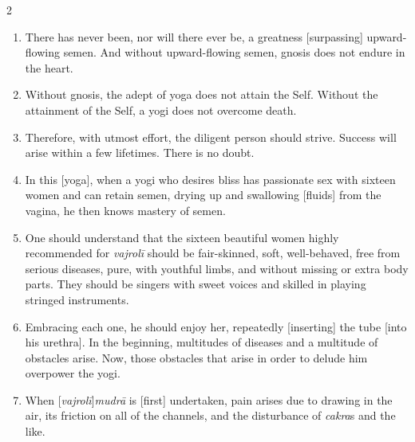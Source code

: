 \newpage

\begin{nohyp}
\begin{multicols}{2}
\begin{eng}
\begin{enumerate}[nosep]
\item[38.] There has never been, nor will there ever be, a greatness [surpassing] upward-flowing semen. And without upward-flowing semen, gnosis does not endure in the heart.
\item[39.] Without gnosis, the adept of yoga does not attain the Self. Without the attainment of the Self, a yogi does not overcome death.
\item[40.] Therefore, with utmost effort, the diligent person should strive. Success will arise within a few lifetimes. There is no doubt.
\item[41.] In this [yoga], when a yogi who desires bliss has passionate sex with sixteen women and can retain semen, drying up and swallowing [fluids] from the vagina, he then knows mastery of semen.
\item[42–43.] One should understand that the sixteen beautiful women highly recommended for \textit{vajrolī} should be fair-skinned, soft, well-behaved, free from serious diseases, pure, with youthful limbs, and without missing or extra body parts. They should be singers with sweet voices and skilled in playing stringed instruments.
\item[44.] Embracing each one, he should enjoy her, repeatedly [inserting] the tube [into his urethra]. In the beginning, multitudes of diseases and a multitude of obstacles arise. Now, those obstacles that arise in order to delude him overpower the yogi.
\item[45.] When [\textit{vajrolī}]\textit{mudrā} is [first] undertaken, pain arises due to drawing in the air, its friction on all of the channels, and the disturbance of \textit{cakra}s and the like.

\end{enumerate}
\end{eng}
\end{multicols}
\end{nohyp}
